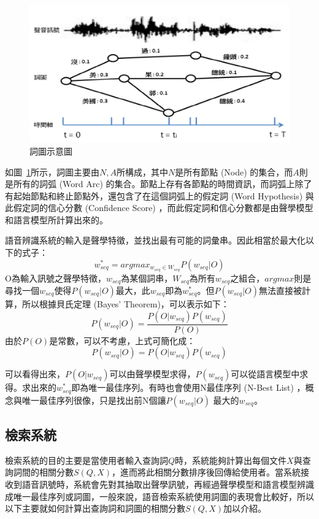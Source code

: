 \begin{figure}
\centering
\includegraphics[scale=0.5]{images/chap2_lattice.png}
\caption{詞圖示意圖} \label{fig:chap2_lattice}
\end{figure}

如圖~\ref{fig:chap2_lattice}所示，詞圖主要由${N, A}$所構成，其中$N$是所有節點 (Node) 的集合，而$A$則是所有的詞弧 (Word Arc) 的集合。節點上存有各節點的時間資訊，而詞弧上除了有起始節點和終止節點外，還包含了在這個詞弧上的假定詞 (Word Hypothesis) 與此假定詞的信心分數 (Confidence Score) ，而此假定詞和信心分數都是由聲學模型和語言模型所計算出來的。

語音辨識系統的輸入是聲學特徵，並找出最有可能的詞彙串。因此相當於最大化以下的式子：
    \begin{equation}
    w^*_{seq} = argmax_{w_{seq} \in W_{seq}}P(w_{seq}|O)
    \end{equation}
O為輸入訊號之聲學特徵，$w_{seq}$為某個詞串，$W_{seq}$為所有$w_{seq}$之組合，$argmax$則是尋找一個$w_{seq}$使得$P(w_{seq}|O)$最大，此$w_{seq}$即為$w^*_{seq}$。但$P(w_{seq}|O)$無法直接被計算，所以根據貝氏定理 (Bayes' Theorem)，可以表示如下：
    \begin{equation}
    P(w_{seq}|O) = \frac{P(O|w_{seq})P(w_{seq})}{P(O)}
    \end{equation}
由於$P(O)$是常數，可以不考慮，上式可簡化成：
    \begin{equation}
    P(w_{seq}|O) = P(O|w_{seq})P(w_{seq})
    \end{equation}

可以看得出來，$P(O|w_{seq})$可以由聲學模型求得，$P(w_{seq})$可以從語言模型中求得。求出來的$w^*_{seq}$即為唯一最佳序列。有時也會使用N最佳序列 (N-Best List) ，概念與唯一最佳序列很像，只是找出前N個讓$P(w_{seq}|O)$ 最大的$w_{seq}$。

\subsection{檢索系統}
\label{subsec:retrievalsystem}
檢索系統的目的主要是當使用者輸入查詢詞$Q$時，系統能夠計算出每個文件$X$與查詢詞間的相關分數$S(Q, X)$，進而將此相關分數排序後回傳給使用者。當系統接收到語音訊號時，系統會先對其抽取出聲學訊號，再經過聲學模型和語言模型辨識成唯一最佳序列或詞圖，一般來說，語音檢索系統使用詞圖的表現會比較好，所以以下主要就如何計算出查詢詞和詞圖的相關分數$S(Q, X)$加以介紹。

